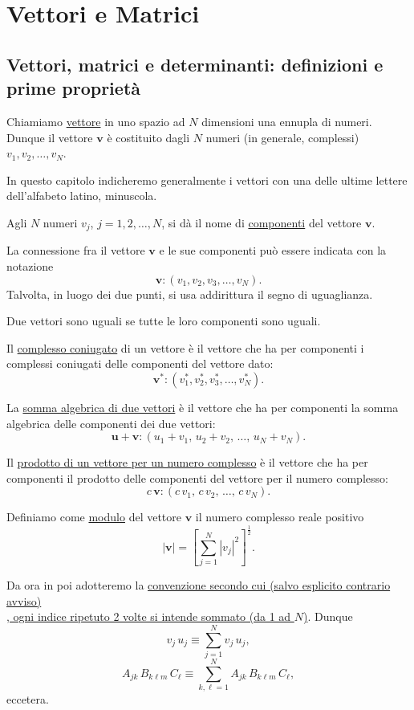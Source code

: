 \documentclass[11pt, a4paper]{book}
\numberwithin{equation}{section}
\begin{document}
\chapter{Vettori e Matrici}

\section{Vettori, matrici e determinanti: definizioni e prime proprietà}

Chiamiamo \uline{vettore} in uno spazio ad $N$ dimensioni una ennupla di numeri. Dunque il vettore $\mathbf{v}$ è costituito dagli $N$ numeri (in generale, complessi) $v_1, v_2, \ldots, v_N$.

In questo capitolo indicheremo generalmente i vettori con una delle ultime lettere dell'alfabeto latino, minuscola.

Agli $N$ numeri $v_j$, $j = 1, 2, \ldots, N$, si dà il nome di \uline{componenti} del vettore $\mathbf{v}$.

La connessione fra il vettore $\mathbf{v}$ e le sue componenti può essere indicata con la notazione
\[
    \mathbf{v} : \left( v_1, v_2, v_3, \ldots, v_N \right).
\]
Talvolta, in luogo dei due punti, si usa addirittura il segno di uguaglianza.

Due vettori sono uguali se tutte le loro componenti sono uguali.

Il \uline{complesso coniugato} di un vettore è il vettore che ha per componenti i complessi coniugati delle componenti del vettore dato:
\[
    \mathbf{v}^* : \left( v_1^*, v_2^*, v_3^*, \ldots, v_N^* \right).
\]

La \uline{somma algebrica di due vettori} è il vettore che ha per componenti la somma algebrica delle componenti dei due vettori:
\[
    \mathbf{u} + \mathbf{v} : \left( u_1 + v_1,\, u_2 + v_2,\, \ldots,\, u_N + v_N \right).
\]

Il \uline{prodotto di un vettore per un numero complesso} è il vettore che ha per componenti il prodotto delle componenti del vettore per il numero complesso:
\[
    c\,\mathbf{v} : \left( c\,v_1,\, c\,v_2,\, \ldots,\, c\,v_N \right).
\]

Definiamo come \uline{modulo} del vettore $\mathbf{v}$ il numero complesso reale positivo
\begin{equation}
    |\mathbf{v}| = \left[ \sum_{j=1}^{N} |v_j|^2 \right]^{\frac{1}{2}}.
    \tag{1a}
\end{equation}

Da ora in poi adotteremo la \uline{convenzione secondo cui (salvo esplicito contrario avviso)} \\ \uline{, ogni indice ripetuto 2 volte si intende sommato (da 1 ad $N$)}. Dunque
\[
    v_j\, u_j \equiv \sum_{j=1}^{N} v_j\, u_j,
\]
\[
    A_{jk}\, B_{k\ell m}\, C_\ell \equiv \sum_{k,\ell=1}^{N} A_{jk}\, B_{k\ell m}\, C_\ell,
\]
eccetera.
\end{document}
